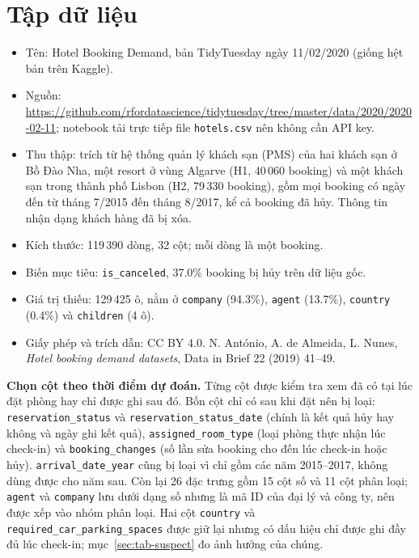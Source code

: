 \section{Tập dữ liệu}
\begin{itemize}[leftmargin=1.5cm]
    \item Tên: Hotel Booking Demand, bản TidyTuesday ngày 11/02/2020 (giống hệt bản trên Kaggle).
    \item Nguồn: \url{https://github.com/rfordatascience/tidytuesday/tree/master/data/2020/2020-02-11};
          notebook tải trực tiếp file \texttt{hotels.csv} nên không cần API key.
    \item Thu thập: trích từ hệ thống quản lý khách sạn (PMS) của hai khách sạn ở Bồ Đào Nha, một resort ở vùng Algarve
          (H1, 40\,060 booking) và một khách sạn trong thành phố Lisbon (H2, 79\,330 booking), gồm mọi booking có ngày đến
          từ tháng 7/2015 đến tháng 8/2017, kể cả booking đã hủy. Thông tin nhận dạng khách hàng đã bị xóa.
    \item Kích thước: 119\,390 dòng, 32 cột; mỗi dòng là một booking.
    \item Biến mục tiêu: \texttt{is\_canceled}, 37.0\% booking bị hủy trên dữ liệu gốc.
    \item Giá trị thiếu: 129\,425 ô, nằm ở \texttt{company} (94.3\%), \texttt{agent} (13.7\%), \texttt{country} (0.4\%)
          và \texttt{children} (4 ô).
    \item Giấy phép và trích dẫn: CC BY 4.0. N. António, A. de Almeida, L. Nunes, \textit{Hotel booking demand datasets},
          Data in Brief 22 (2019) 41--49.
\end{itemize}

\textbf{Chọn cột theo thời điểm dự đoán.} Từng cột được kiểm tra xem đã có tại lúc đặt phòng hay chỉ được ghi sau đó.
Bốn cột chỉ có sau khi đặt nên bị loại: \texttt{reservation\_status} và \texttt{reservation\_status\_date} (chính là kết quả hủy hay không
và ngày ghi kết quả), \texttt{assigned\_room\_type} (loại phòng thực nhận lúc check-in) và \texttt{booking\_changes}
(số lần sửa booking cho đến lúc check-in hoặc hủy). \texttt{arrival\_date\_year} cũng bị loại vì chỉ gồm các năm 2015--2017,
không dùng được cho năm sau. Còn lại 26 đặc trưng gồm 15 cột số và 11 cột phân loại; \texttt{agent} và \texttt{company}
lưu dưới dạng số nhưng là mã ID của đại lý và công ty, nên được xếp vào nhóm phân loại. Hai cột \texttt{country} và
\texttt{required\_car\_parking\_spaces} được giữ lại nhưng có dấu hiệu chỉ được ghi đầy đủ lúc check-in; mục~\ref{sec:tab-suspect}
đo ảnh hưởng của chúng.

